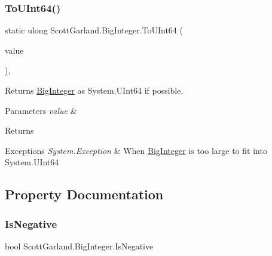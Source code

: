 \subsubsection{\texorpdfstring{To\+U\+Int64()}{ToUInt64()}}
{\footnotesize\ttfamily static ulong Scott\+Garland.\+Big\+Integer.\+To\+U\+Int64 (\begin{DoxyParamCaption}\item[{\hyperlink{class_scott_garland_1_1_big_integer}{Big\+Integer}}]{value }\end{DoxyParamCaption})\hspace{0.3cm}{\ttfamily [inline]}, {\ttfamily [static]}}



Returns \hyperlink{class_scott_garland_1_1_big_integer}{Big\+Integer} as System.\+U\+Int64 if possible. 


\begin{DoxyParams}{Parameters}
{\em value} & \\
\hline
\end{DoxyParams}
\begin{DoxyReturn}{Returns}

\end{DoxyReturn}

\begin{DoxyExceptions}{Exceptions}
{\em System.\+Exception} & When \hyperlink{class_scott_garland_1_1_big_integer}{Big\+Integer} is too large to fit into System.\+U\+Int64\\
\hline
\end{DoxyExceptions}


\subsection{Property Documentation}
\mbox{\label{class_scott_garland_1_1_big_integer_a3bed3f2524ecfac198f5d93cfccad0b0}} 
\subsubsection{\texorpdfstring{Is\+Negative}{IsNegative}}
{\footnotesize\ttfamily bool Scott\+Garland.\+Big\+Integer.\+Is\+Negative\hspace{0.3cm}{\ttfamily [get]}}



